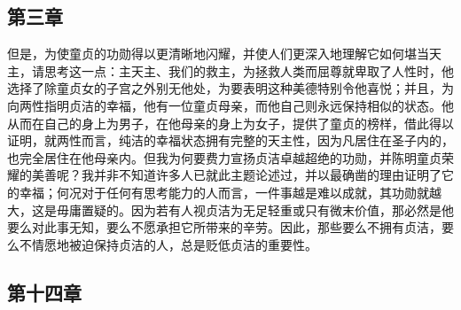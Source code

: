 
\subsection{第三章}

但是，为使童贞的功勋得以更清晰地闪耀，并使人们更深入地理解它如何堪当天主，请思考这一点：主天主、我们的救主，为拯救人类而屈尊就卑取了人性时，他选择了除童贞女的子宫之外别无他处，为要表明这种美德特别令他喜悦；并且，为向两性指明贞洁的幸福，他有一位童贞母亲，而他自己则永远保持相似的状态。他从而在自己的身上为男子，在他母亲的身上为女子，提供了童贞的榜样，借此得以证明，就两性而言，纯洁的幸福状态拥有完整的天主性，因为凡居住在圣子内的，也完全居住在他母亲内。但我为何要费力宣扬贞洁卓越超绝的功勋，并陈明童贞荣耀的美善呢？我并非不知道许多人已就此主题论述过，并以最确凿的理由证明了它的幸福；何况对于任何有思考能力的人而言，一件事越是难以成就，其功勋就越大，这是毋庸置疑的。因为若有人视贞洁为无足轻重或只有微末价值，那必然是他要么对此事无知，要么不愿承担它所带来的辛劳。因此，那些要么不拥有贞洁，要么不情愿地被迫保持贞洁的人，总是贬低贞洁的重要性。\par


\subsection{第十四章}

